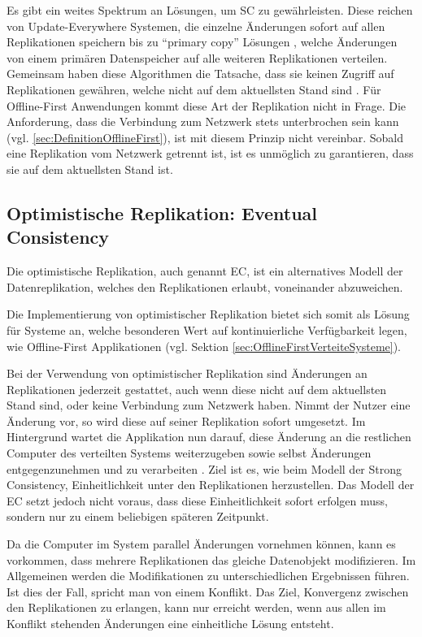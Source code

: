 \documentclass[a4paper, 12pt]{scrreprt}
\begin{document}
Es gibt ein weites Spektrum an Lösungen, um \ac{SC} zu gewährleisten. Diese reichen von {Update-Everywhere} Systemen, die einzelne Änderungen sofort auf allen Replikationen speichern \autocite{ThesisUpdateEverywhere} bis zu \enquote{primary copy} Lösungen \autocite[S.14]{BookPrimaryReplica}, welche Änderungen von einem primären Datenspeicher auf alle weiteren Replikationen verteilen. Gemeinsam haben diese Algorithmen die Tatsache, dass sie keinen Zugriff auf Replikationen gewähren, welche nicht auf dem aktuellsten Stand sind \autocite[S.43]{ArticleOptimisticReplication}. Für Offline-First Anwendungen kommt diese Art der Replikation nicht in Frage. Die Anforderung, dass die Verbindung zum Netzwerk stets unterbrochen sein kann (vgl. \ref{sec:DefinitionOfflineFirst}), ist mit diesem Prinzip nicht vereinbar. Sobald eine Replikation vom Netzwerk getrennt ist, ist es unmöglich zu garantieren, dass sie auf dem aktuellsten Stand ist.


\subsection{Optimistische Replikation: Eventual Consistency}

Die optimistische Replikation, auch genannt \acf{EC}, ist ein alternatives Modell der Datenreplikation, welches den Replikationen erlaubt, voneinander abzuweichen.

Die Implementierung von optimistischer Replikation bietet sich somit als Lösung für Systeme an, welche besonderen Wert auf kontinuierliche Verfügbarkeit legen, wie Offline-First Applikationen (vgl. Sektion \ref{sec:OfflineFirstVerteiteSysteme}). 

Bei der Verwendung von optimistischer Replikation sind Änderungen an Replikationen jederzeit gestattet, auch wenn diese nicht auf dem aktuellsten Stand sind, oder keine Verbindung zum Netzwerk haben. Nimmt der Nutzer eine Änderung vor, so wird diese auf seiner Replikation sofort umgesetzt. Im Hintergrund wartet die Applikation nun darauf, diese Änderung an die restlichen Computer des verteilten Systems weiterzugeben sowie selbst Änderungen entgegenzunehmen und zu verarbeiten \autocite[S.46]{ArticleOptimisticReplication}. Ziel ist es, wie beim Modell der Strong Consistency, Einheitlichkeit unter den Replikationen herzustellen. Das Modell der \ac{EC} setzt jedoch nicht voraus, dass diese Einheitlichkeit sofort erfolgen muss, sondern nur zu einem beliebigen späteren Zeitpunkt. 

Da die Computer im System parallel Änderungen vornehmen können, kann es vorkommen, dass mehrere Replikationen das gleiche Datenobjekt modifizieren. Im Allgemeinen werden die Modifikationen zu unterschiedlichen Ergebnissen führen. Ist dies der Fall, spricht man von einem Konflikt. Das Ziel, Konvergenz zwischen den Replikationen zu erlangen, kann nur erreicht werden, wenn aus allen im Konflikt stehenden Änderungen eine einheitliche Lösung entsteht.
\end{document}
